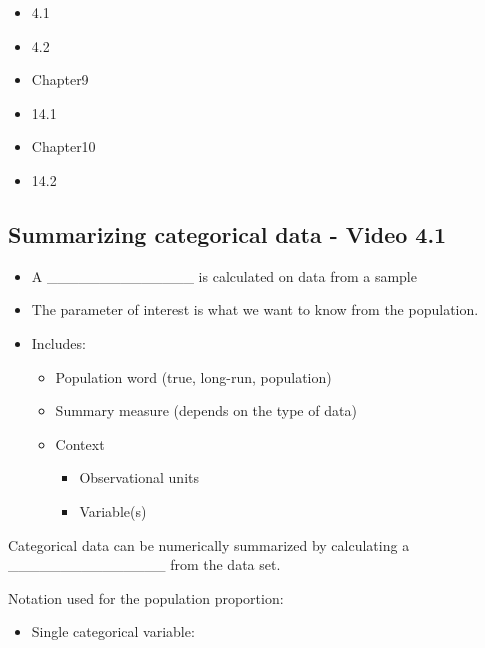 \documentclass[
]{report}
\providecommand{\tightlist}{%
  \setlength{\itemsep}{0pt}\setlength{\parskip}{0pt}}
\begin{document}
\begin{itemize}
\item
  4.1
\item
  4.2
\item
  Chapter9
\item
  14.1
\item
  Chapter10
\item
  14.2
\end{itemize}


\subsection*{Summarizing categorical data - Video 4.1}\label{summarizing-categorical-data---video-4.1}

\begin{itemize}
\item
  A \_\_\_\_\_\_\_\_\_\_\_\_\_\_ is calculated on data from a sample
\item
  The parameter of interest is what we want to know from the population.
\item
  Includes:

  \begin{itemize}
  \item
    Population word (true, long-run, population)
  \item
    Summary measure (depends on the type of data)
  \item
    Context

    \begin{itemize}
    \item
      Observational units
    \item
      Variable(s)
    \end{itemize}
  \end{itemize}
\end{itemize}

Categorical data can be numerically summarized by calculating a \_\_\_\_\_\_\_\_\_\_\_\_\_\_\_ from the data set.

Notation used for the population proportion:

\begin{itemize}
\tightlist
\item
  Single categorical variable:
\end{itemize}

\vspace{0.2in}
\end{document}

